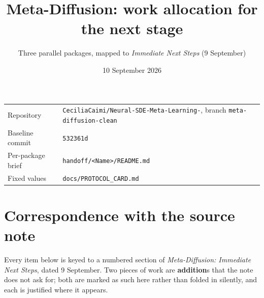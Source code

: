 \documentclass[11pt]{article}
\title{\vspace{-1.5em}Meta-Diffusion: work allocation for the next stage}
\author{Three parallel packages, mapped to \emph{Immediate Next Steps} (9 September)}
\date{10 September 2026}
\newcommand{\code}[1]{\texttt{\small #1}}
\newcommand{\add}{\textcolor{addition}{\textbf{addition}}}
\begin{document}
\maketitle

\noindent
\begin{tabularx}{\textwidth}{@{}lX@{}}
\toprule
Repository & \code{CeciliaCaimi/Neural-SDE-Meta-Learning-}, branch \code{meta-diffusion-clean} \\
Baseline commit & \code{532361d} \\
Per-package brief & \code{handoff/<Name>/README.md} \\
Fixed values & \code{docs/PROTOCOL\_CARD.md} \\
\bottomrule
\end{tabularx}

\vspace{1em}

\section{Correspondence with the source note}

Every item below is keyed to a numbered section of \emph{Meta-Diffusion: Immediate Next
Steps}, dated 9 September. Two pieces of work are \add s that the note does not ask for;
both are marked as such here rather than folded in silently, and each is justified where
it appears.
\end{document}
